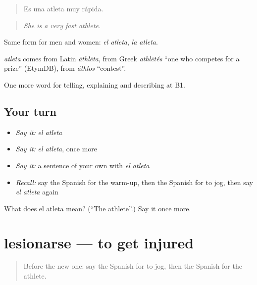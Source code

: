 \begin{quote}
Es una atleta muy rápida.
\end{quote}

\begin{quote}
\emph{She is a very fast athlete.}
\end{quote}

Same form for men and women: \emph{el atleta}, \emph{la atleta}.

\begin{cousinweb}
\emph{atleta} comes from Latin \emph{āthlēta}, from Greek \emph{athlēt\'{\={e}}s} \textquotedblleft{}one who competes for a prize\textquotedblright{} (EtymDB), from \emph{áthlos} \textquotedblleft{}contest\textquotedblright{}.
\end{cousinweb}

\begin{grammarlens}[title={What you've built}]
One more word for telling, explaining and describing at B1.
\end{grammarlens}

\subsection*{Your turn}
\begin{itemize}
\raggedright
  \item \emph{Say it:} \emph{el atleta}
  \item \emph{Say it:} \emph{el atleta}, once more
  \item \emph{Say it:} a sentence of your own with \emph{el atleta}
  \item \emph{Recall:} say the Spanish for the warm-up, then the Spanish for to jog, then say \emph{el atleta} again
\end{itemize}

\begin{tcolorbox}[breakable,colback=teal!4,colframe=teal!35!black,title={Before you move on}]
What does el atleta mean? (\textquotedblleft{}The athlete\textquotedblright{}.) Say it once more.
\end{tcolorbox}
\section[lesionarse]{lesionarse — to get injured}

\label{lesson:ES-C755-lesionarse}



\begin{quote}
Before the new one: say the Spanish for to jog, then the Spanish for the athlete.
\end{quote}

